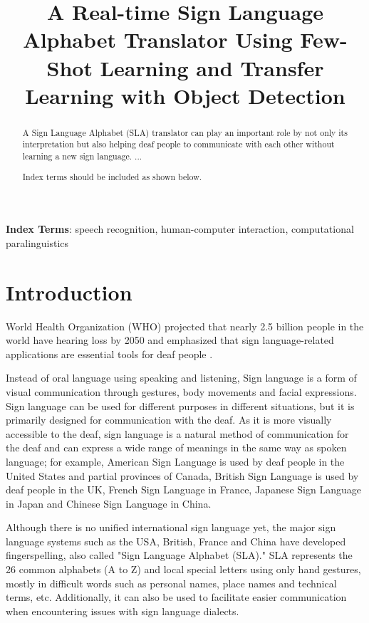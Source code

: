 \documentclass[a4paper]{article}
\title{A Real-time Sign Language Alphabet Translator Using Few-Shot Learning and Transfer Learning with Object Detection}
\begin{document}
\maketitle
% 
\begin{abstract}
  A Sign Language Alphabet (SLA) translator can play an important role by not only its interpretation but also helping deaf people to communicate with each other without learning a new sign language. ...

  Index terms should be included as shown below.
\end{abstract}
\noindent\textbf{Index Terms}: speech recognition, human-computer interaction, computational paralinguistics

\section{Introduction}
World Health Organization (WHO) projected that nearly 2.5 billion people in the world have hearing loss by 2050 and emphasized that sign language-related applications are essential tools for deaf people \cite{WHO2050}.

Instead of oral language using speaking and listening, Sign language is a form of visual communication through gestures, body movements and facial expressions. Sign language can be used for different purposes in different situations, but it is primarily designed for communication with the deaf. As it is more visually accessible to the deaf, sign language is a natural method of communication for the deaf and can express a wide range of meanings in the same way as spoken language; for example, American Sign Language is used by deaf people in the United States and partial provinces of Canada, British Sign Language is used by deaf people in the UK, French Sign Language in France, Japanese Sign Language in Japan and Chinese Sign Language in China.

Although there is no unified international sign language yet, the major sign language systems such as the USA, British, France and China have developed fingerspelling, also called "Sign Language Alphabet (SLA)." SLA represents the 26 common alphabets (A to Z) and local special letters using only hand gestures, mostly in difficult words such as personal names, place names and technical terms, etc. Additionally, it can also be used to facilitate easier communication when encountering issues with sign language dialects. 
\end{document}
